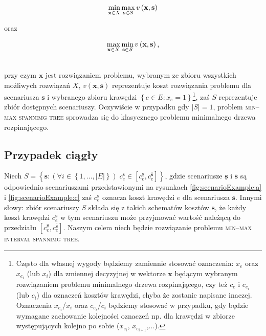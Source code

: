 \noindent\begin{minipage}{.3\linewidth}
	\begin{equation}\label{eq:minmax}
		\min_{ \mathclap{\textbf{x} \in X}} \max_{ \mathclap{\textbf{s} \in \mathcal{S}}} v \left( \textbf{x}, \textbf{s} \right)
	\end{equation}
\end{minipage}%
\begin{minipage}{.3\linewidth}
	\centering
	oraz
\end{minipage}%
\begin{minipage}{.3\linewidth}
	\begin{equation}\label{eq:maxmin}
	\max_{ \mathclap{\textbf{x} \in X}} \min_{ \mathclap{\textbf{s} \in \mathcal{S}}} v \left( \textbf{x}, \textbf{s} \right) \text{,}
	\end{equation}
\end{minipage}
\vspace{5px}
\\
przy czym $\textbf{x}$ jest rozwiązaniem problemu, wybranym ze zbioru wszystkich możliwych rozwiązań $X$, $v \left( \textbf{x}, \textbf{s} \right)$ reprezentuje koszt rozwiązania problemu dla scenariusza $\textbf{s}$ i wybranego zbioru krawędzi $\left\{ e \in E : x_{e} = 1 \right\}$\footnote{Często dla własnej wygody będziemy zamiennie stosować oznaczenia: $x_{e}$ oraz $x_{e_{i}}$ (lub $x_{i}$) dla zmiennej decyzyjnej w wektorze $\textbf{x}$ będącym wybranym rozwiązaniem problemu minimalnego drzewa rozpinającego, czy też $c_{e}$ i $c_{e_{i}}$ (lub $c_{i}$) dla oznaczeń kosztów krawędzi, chyba że zostanie napisane inaczej. Oznaczenia $x_{e_{i}}$/$x_{i}$ oraz $c_{e_{i}}$/$c_{i}$ będziemy stosować w przypadku, gdy będzie wymagane zachowanie kolejności oznaczeń np. dla krawędzi w zbiorze występujących kolejno po sobie ($x_{e_{i}}$, $x_{e_{i+1}}$,...).}, zaś $S$ reprezentuje zbiór dostępnych scenariuszy. Oczywiście w przypadku gdy $\left| S \right| = 1$, problem \textsc{min--max spannimg tree} sprowadza się do klasycznego problemu minimalnego drzewa rozpinającego.

\subsection{Przypadek ciągły}

Niech $S = \left\{ \textbf{s} : \left( \forall i \in \left\{ 1, \dots, \left| E \right| \right\} \right) \; c^{\textbf{s}}_{e} \in \left[ c^{\underline{\textbf{s}}}_{e}, c^{\overline{\textbf{s}}}_{e} \right] \right\}$, gdzie scenariusze $\underline{\textbf{s}}$ i $\overline{\textbf{s}}$ są odpowiednio scenariuszami przedstawionymi na rysunkach \ref{fig:scenarioExample:a} i \ref{fig:scenarioExample:c} zaś $c^{\textbf{s}}_{e}$ oznacza koszt krawędzi $e$ dla scenariusza $\textbf{s}$. Innymi słowy: zbiór scenariuszy $S$ składa się z takich schematów kosztów $\textbf{s}$, że każdy koszt krawędzi $c^{\textbf{s}}_{e}$ w tym scenariuszu może przyjmować wartość należącą do przedziału $\left[ c^{\underline{\textbf{s}}}_{e}, c^{\overline{\textbf{s}}}_{e} \right]$. Naszym celem niech będzie rozwiązanie problemu \textsc{min--max interval spannimg tree}.

